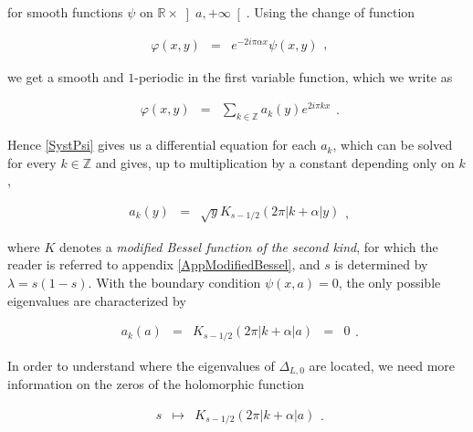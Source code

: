 \documentclass{jams-l}
\theoremstyle{definition}
\theoremstyle{remark}
\numberwithin{equation}{section}
\begin{document}
            \noindent for smooth functions $\psi$ on $\mathbb{R} \times \left] a, +\infty \right[$. Using the change of function
            
            \[ \begin{array}{lll}
                    \varphi \left( x, y \right) & = & e^{- 2 i \pi \alpha x} \psi \left( x, y \right)
                \end{array} , \]
            
            \noindent we get a smooth and $1$-periodic in the first variable function, which we write as
            
            \[ \begin{array}{lll}
                    \varphi \left( x, y \right) & = & \sum\limits_{k \in \mathbb{Z}} a_k \left( y \right) e^{2 i \pi k x}
                \end{array} . \]
            
            \noindent Hence \eqref{SystPsi} gives us a differential equation for each $a_k$, which can be solved for every $k \in \mathbb{Z}$ and gives, up to multiplication by a constant depending only on $k$,
            
            \[ \begin{array}{lll}
                    a_k \left( y \right) & = & \sqrt{y} K_{s-1/2} \left( 2 \pi \left \vert k + \alpha \right \vert y \right)
                \end{array} , \]
            
            \noindent where $K$ denotes a \textit{modified Bessel function of the second kind}, for which the reader is referred to appendix \ref{AppModifiedBessel}, and $s$ is determined by $\lambda = s \left( 1-s \right)$. With the boundary condition $\psi \left( x,a \right) = 0$, the only possible eigenvalues are characterized by
            
            \[ \begin{array}{lllll}
                    a_k \left( a \right) & = & K_{s-1/2} \left( 2 \pi \left \vert k + \alpha \right \vert a \right) & = & 0
                \end{array} . \]
            
            \noindent In order to understand where the eigenvalues of $\Delta_{L,0}$ are located, we need more information on the zeros of the holomorphic function
            
            \[ \begin{array}{lll}
                    s & \longmapsto & K_{s-1/2} \left( 2 \pi \left \vert k + \alpha \right \vert a \right)
                \end{array} . \]
            
\end{document}
